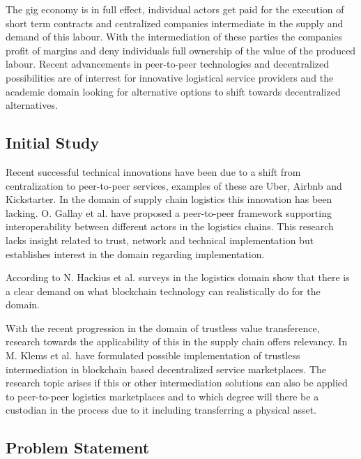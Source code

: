 The gig economy is in full effect, individual actors get paid for the execution of short term contracts and centralized companies intermediate in the supply and demand of this labour. With the intermediation of these parties the companies profit of margins and deny individuals full ownership of the value of the produced labour. Recent advancements in peer-to-peer technologies and decentralized possibilities are of interrest for innovative logistical service providers and the academic domain looking for alternative options to shift towards decentralized alternatives.\par

\subsection{Initial Study}

Recent successful technical innovations have been due to a shift from centralization to peer-to-peer services, examples of these are Uber, Airbnb and Kickstarter. In the domain of supply chain logistics this innovation has been lacking. O. Gallay et al. \cite{peer-to-peerDecentralizedLogistics} have proposed a peer-to-peer framework supporting interoperability between different actors in the logistics chains. This research lacks insight related to trust, network and technical implementation but establishes interest in the domain regarding implementation. \par
According to N. Hackius et al. \cite{hackius2017blockchain} surveys in the logistics domain show that there is a clear demand on what blockchain technology can realistically do for the domain. \par
With the recent progression in the domain of trustless value transference, research towards the applicability of this in the supply chain offers relevancy. In \cite{trustlessIntermediationInBCServiceMarket} M. Klems et al. have formulated possible implementation of trustless intermediation in blockchain based decentralized service marketplaces. The research topic arises if this or other intermediation solutions can also be applied to peer-to-peer logistics marketplaces and to which degree will there be a custodian in the process due to it including transferring a physical asset.

\subsection{Problem Statement}

